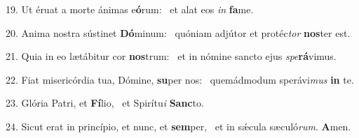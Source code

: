 19. Ut éruat a morte ánimas e\textbf{ó}rum: \ast\  et alat eos \textit{in} \textbf{fa}me.\

20. Anima nostra sústinet \textbf{Dó}minum: \ast\  quóniam adjútor et protéc\textit{tor} \textbf{nos}ter est.\

21. Quia in eo lætábitur cor \textbf{nos}trum: \ast\  et in nómine sancto ejus \textit{spe}\textbf{rá}vimus.\

22. Fiat misericórdia tua, Dómine, \textbf{su}per nos: \ast\  quemádmodum sperávi\textit{mus} \textbf{in} te.\

23. Glória Patri, et \textbf{Fí}lio, \ast\  et Spirítu\textit{i} \textbf{Sanc}to.\

24. Sicut erat in princípio, et nunc, et \textbf{sem}per, \ast\  et in sǽcula sæculó\textit{rum}. \textbf{A}men.\


